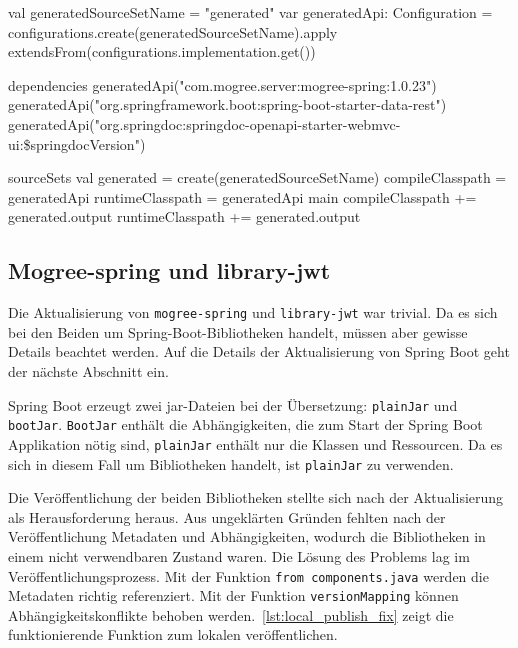 \begin{JavaCode}[numbers=none, caption={Die Erstellung eines neuen \texttt{SourceSets} und die Referenzierung davon in einem anderen \texttt{SourceSet}.}, label={lst:generated_source_set}]
val generatedSourceSetName = "generated"
var generatedApi: Configuration = configurations.create(generatedSourceSetName).apply {
    extendsFrom(configurations.implementation.get())
}

dependencies {
    generatedApi("com.mogree.server:mogree-spring:1.0.23")
    generatedApi("org.springframework.boot:spring-boot-starter-data-rest")
    generatedApi("org.springdoc:springdoc-openapi-starter-webmvc-ui:\$springdocVersion")
}

sourceSets {
    val generated = create(generatedSourceSetName) {
        compileClasspath = generatedApi
        runtimeClasspath = generatedApi
    }
    main {
        compileClasspath += generated.output
        runtimeClasspath += generated.output
    }
}
\end{JavaCode}

\subsection{Mogree-spring und library-jwt}

Die Aktualisierung von \texttt{mogree-spring} und \texttt{library-jwt} war trivial. Da es sich bei den Beiden um Spring-Boot-Bibliotheken handelt, müssen aber gewisse Details beachtet werden. Auf die Details der Aktualisierung von Spring Boot geht der nächste Abschnitt ein.

Spring Boot erzeugt zwei jar-Dateien bei der Übersetzung: \texttt{plainJar} und \texttt{bootJar}. \texttt{BootJar} enthält die Abhängigkeiten, die zum Start der Spring Boot Applikation nötig sind, \texttt{plainJar} enthält nur die Klassen und Ressourcen. Da es sich in diesem Fall um Bibliotheken handelt, ist \texttt{plainJar} zu verwenden.

Die Veröffentlichung der beiden Bibliotheken stellte sich nach der Aktualisierung als Herausforderung heraus. Aus ungeklärten Gründen fehlten nach der Veröffentlichung Metadaten und Abhängigkeiten, wodurch die Bibliotheken in einem nicht verwendbaren Zustand waren. Die Lösung des Problems lag im Veröffentlichungsprozess. Mit der Funktion \texttt{from components.java} werden die Metadaten richtig referenziert. Mit der Funktion \texttt{versionMapping} können Abhängigkeitskonflikte behoben werden.~\autoref{lst:local_publish_fix} zeigt die funktionierende Funktion zum lokalen veröffentlichen.

